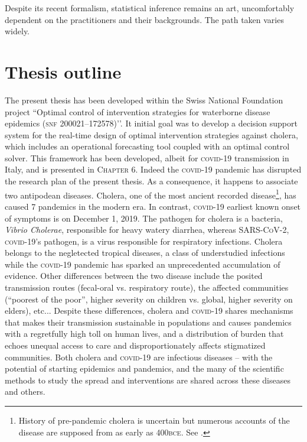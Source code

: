  Despite its recent formalism, statistical inference remains an art, uncomfortably dependent on the practitioners and their backgrounds. The path taken varies widely.



\section{Thesis outline}

The present thesis has been developed within the Swiss National Foundation project ``Optimal control of intervention strategies for waterborne disease epidemics (\textsc{snf} 200021–172578)’’. It initial goal was to develop a decision support system for the real-time design of optimal intervention strategies against cholera, which includes an operational forecasting tool coupled with an optimal control solver. This framework has been developed, albeit for \textsc{covid}-19 transmission in Italy, and is presented in \textsc{Chapter 6}. Indeed the \textsc{covid}-19 pandemic has disrupted the research plan of the present thesis. As a consequence, it happens to associate two antipodean diseases. Cholera, one of the most ancient recorded disease\footnote[][10\baselineskip]{History of pre-pandemic cholera is uncertain but numerous accounts of the disease are supposed from as early as 400\textsc{bce}. See .}, has caused 7 pandemics in the modern era. In contrast, \textsc{covid}-19 earliest known onset of symptoms is on December 1, 2019. The pathogen for cholera is a bacteria, \textit{Vibrio Cholerae}, responsible for heavy watery diarrhea, whereas \textsc{SARS-CoV-2}, \textsc{covid}-19’s pathogen, is a virus responsible for respiratory infections. Cholera belongs to the negletected tropical diseases, a class of understudied infections while the \textsc{covid}-19 pandemic has sparked an unprecedented accumulation of evidence. 
Other differences between the two disease include the posited transmission routes (fecal-oral vs. respiratory route), the affected communities (``poorest of the poor”, higher severity on children vs. global, higher severity on elders), etc... Despite these differences, cholera and \textsc{covid}-19 shares mechanisms that makes their transmission sustainable in populations and causes pandemics with a regretfully high toll on human lives, and a distribution of burden that echoes unequal access to care and disproportionately affects stigmatized communities. Both cholera and \textsc{covid}-19 are infectious diseases -- with the potential of starting epidemics and pandemics, and the many of the scientific methods to study the spread and interventions are shared across these diseases and others.

